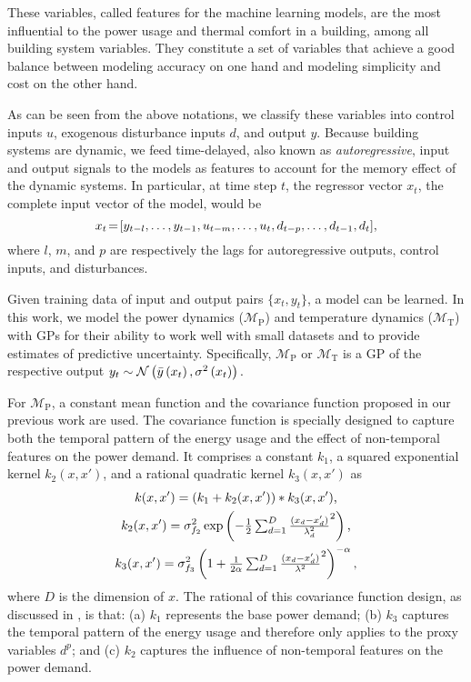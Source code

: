 These variables, called features for the machine learning models, are the most influential to the power usage and thermal comfort in a building, among all building system variables.
They constitute a set of variables that achieve a good balance between modeling accuracy on one hand and modeling simplicity and cost on the other hand.


As can be seen from the above notations, we classify these variables into control inputs \(u\), exogenous disturbance inputs \(d\), and output \(y\).
Because building systems are dynamic, we feed time-delayed, also known as \emph{autoregressive}, input and output signals to the models as features to account for the memory effect of the dynamic systems.
In particular, at time step $t$, the regressor vector $x_{t}$, \ie the complete input vector of the model, would be
\begin{equation}
  \label{E:GP:features}
  x_{t}\!=\![y_{t-l}, \dots, y_{t-1}, u_{t-m}, \dots, u_t, d_{t-p}, \dots, d_{t-1}, d_t] \text,
\end{equation}
where \(l\), \(m\), and \(p\) are respectively the lags for autoregressive outputs, control inputs, and disturbances.

Given training data of input and output pairs $\{x_{t}, y_{t}\}$, a model can be learned.
%
In this work, we model the power dynamics ($\mathcal{M}_{\mathrm{P}}$) and temperature dynamics ($\mathcal{M}_{\mathrm{T}}$) with GPs for their ability to work well with small datasets and to provide estimates of predictive uncertainty.
Specifically, $\mathcal{M}_{\mathrm{P}}$ or $\mathcal{M}_{\mathrm{T}}$ is a GP of the respective output
\begin{math}
  y_{t} \sim \operatorname*{\mathcal{N}}\left(\bar{y}\left(x_{t}\right), \sigma^{2}\left(x_{t}\right)\right) \text.
\end{math}

For $\mathcal{M}_{\mathrm{P}}$, a constant mean function and the covariance function proposed in our previous work \cite{nghiemetal16gp} are used.
The covariance function is specially designed to capture both the temporal pattern of the energy usage and the effect of non-temporal features on the power demand.
It comprises a constant \(k_{1}\), a squared exponential kernel \(k_2(x,x')\), and a rational quadratic kernel \(k_{3}(x,x')\) as
%
\begin{gather}
  k(x,x') = \left(k_1 + k_2(x,x')\right)*k_3(x,x')\text,\nonumber\\
  k_2(x,x') = \sigma_{f_2}^2 \exp \left( -\textstyle\frac{1}{2} \textstyle\sum_{d=1}^D \frac{(x_d-x_d')}{{\lambda_d^2}}^2 \right)\text,
 \nonumber\\
 k_3(x,x') = \sigma_{f_3}^2  \left( 1+ \textstyle\frac{1}{2\alpha} \textstyle\sum_{d=1}^D \frac{(x_d-x_d')}{{\lambda^2}}^2 \right)^{-\alpha}\text,
\end{gather}
%
where \(D\) is the dimension of \(x\).
The rational of this covariance function design, as discussed in \cite{nghiemetal16gp}, is that:
(a) $k_{1}$ represents the base power demand;
(b) $k_{3}$ captures the temporal pattern of the energy usage and therefore only applies to the proxy variables $d^{p}$; and
(c) $k_{2}$ captures the influence of non-temporal features on the power demand.

